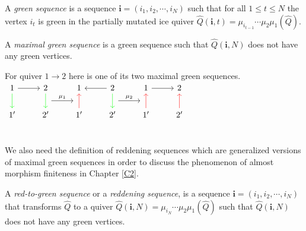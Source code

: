 \begin{definition}
A \textit{green sequence} is a sequence $\mathbf{i}=(i_1, i_2,\cdots, i_N)$ such that for all $1\leq t\leq N$ the vertex $i_t$ is green in the partially mutated ice quiver $\hat{Q}(\mathbf{i},t)=\mu_{i_{t-1}}\cdots\mu_2\mu_1(\hat{Q})$.
\end{definition}
\begin{definition}
A \textit{maximal green sequence} is a green sequence such that $\hat{Q}(\mathbf{i},N)$ does not have any green vertices.
\end{definition}
\begin{example} For quiver $1\to 2$ here is one of its two maximal green sequences.\\
 $\begin{tikzcd}
1 \arrow[r] \arrow[d,green] & 2\arrow [d,green]\arrow[r,"\mu_1", shift right=3.5ex]  & 1&2\arrow[l]\arrow[d,green]\arrow[r,"\mu_2", shift right=3.5ex]&1\arrow[r] & 2\\
1' & 2'&1'\arrow[u,red]& 2'&1'\arrow[u,red] & 2'\arrow[u,red]\\
\end{tikzcd}$
\end{example}
\indent We also need the definition of reddening sequences which are generalized versions of maximal green sequences in order to discuss the phenomenon of almost morphism finiteness in Chapter \ref{C2}.\\
\begin{definition}
A \textit{red-to-green sequence} or a \textit{reddening sequence}, is a sequence $\mathbf{i}=(i_1, i_2,\cdots, i_N)$ that transforms $\hat{Q}$ to a quiver $\hat{Q}(\mathbf{i},N) = \mu_{i_N}\cdots\mu_2\mu_1(\hat{Q})$ such that $\hat{Q}(\mathbf{i},N)$ does not have any green vertices.\cite{Mul15}\\
\end{definition}
